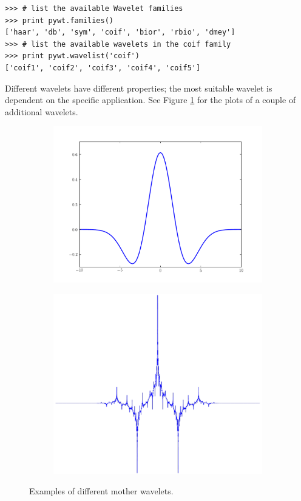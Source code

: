 \begin{lstlisting}
>>> # list the available Wavelet families
>>> print pywt.families()
['haar', 'db', 'sym', 'coif', 'bior', 'rbio', 'dmey']
>>> # list the available wavelets in the coif family
>>> print pywt.wavelist('coif')
['coif1', 'coif2', 'coif3', 'coif4', 'coif5']

\end{lstlisting}
Different wavelets have different properties; the most suitable wavelet is dependent on the specific application.
See Figure \ref{fig:more_wavelets} for the plots of a couple of additional wavelets.
\begin{figure}
\begin{subfigure}[b]{0.45\textwidth}
    \includegraphics[width=\textwidth]{figures/mexicanHat}
\end{subfigure}
\begin{subfigure}[b]{0.45\textwidth}
    \includegraphics[width=\textwidth]{figures/db5_3}
\end{subfigure}
\caption{Examples of different mother wavelets.}
\label{fig:more_wavelets}
\end{figure}

